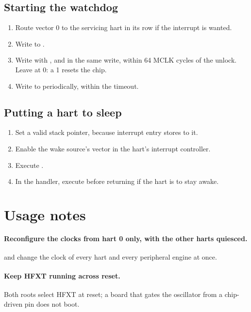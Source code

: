 \subsection{Starting the watchdog}

\begin{enumerate}
	\item Route vector 0 to the servicing hart in its  row if the interrupt is wanted.
	\item Write \texttt{\WdtUnlockPassword} to .
	\item Write  with ,  and  in the same write, within 64 MCLK cycles of the unlock. Leave  at 0: a 1 resets the chip.
	\item Write \texttt{\WdtClearPassword} to  periodically, within the timeout.
\end{enumerate}

\subsection{Putting a hart to sleep}

\begin{enumerate}
	\item Set a valid stack pointer, because interrupt entry stores to it.
	\item Enable the wake source's vector in the hart's interrupt controller.
	\item Execute .
	\item In the handler, execute  before returning if the hart is to stay awake.
\end{enumerate}

\section{Usage notes}

\paragraph{Reconfigure the clocks from hart 0 only, with the other harts quiesced.}  and  change the clock of every hart and every peripheral engine at once.

\paragraph{Keep HFXT running across reset.} Both roots select HFXT at reset; a board that gates the oscillator from a chip-driven pin does not boot.

